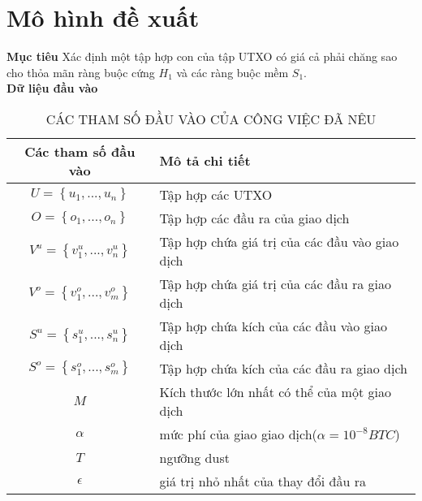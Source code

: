 \newpage
\section{Mô hình đề xuất}\label{model}

\textbf{Mục tiêu} Xác định một tập hợp con của tập UTXO có giá cả phải chăng sao cho thỏa mãn ràng buộc cứng $H_1$ và các ràng buộc mềm $S_1$.\\
\textbf{Dữ liệu đầu vào}

\begin{table}[!h]
	\centering
	\def\arraystretch{1.5}
	\begin{tabular}{|c|l|}
	\hline
	Các tham số đầu vào          				 & Mô tả chi tiết                                                                \\ \hline
	$U = \left\{ {{u_1},...,{u_n}} \right\}$	 & Tập hợp các UTXO                                                              \\ \hline
	$O = \left\{ {{o_1},...,{o_n}} \right\}$	 & Tập hợp các đầu ra của giao dịch                                                 \\ \hline
	${V^u} = \left\{ {v_1^u,...,v_n^u} \right\}$ & Tập hợp chứa giá trị của các đầu vào giao dịch                                                       \\ \hline
	${V^o} = \left\{ {v_1^o,...,v_m^o} \right\}$ & Tập hợp chứa giá trị của các đầu ra giao dịch                             \\ \hline
	${S^u} = \left\{ {s_1^u,...,s_n^u} \right\}$ & Tập hợp chứa kích của các đầu vào giao dịch            \\ \hline
	${S^o} = \left\{ {s_1^o,...,s_m^o} \right\}$ & Tập hợp chứa kích của các đầu ra giao dịch                                          \\ \hline
	$M$						 					 & Kích thước lớn nhất có thể của một giao dịch                                              \\ \hline
	$\alpha$                     				 & mức phí của giao giao dịch($\alpha = 10^{-8}BTC$)                                                                   \\ \hline
	$T$		                  					 & ngưỡng dust                                                             \\ \hline
	$\epsilon$ 								 	 & giá trị nhỏ nhất của thay đổi đầu ra                                                   \\ \hline
	\end{tabular}

	\caption{CÁC THAM SỐ ĐẦU VÀO CỦA CÔNG VIỆC ĐÃ NÊU}
\end{table} 

